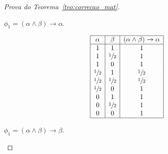 \begin{proof}[Prova do Teorema~\ref{teo:correcao_mat}]
\begin{provaporcasos}
\begin{provaporsubcasos}
                    

                    \subcasodeprova{} $\phi_{1} = (\alpha \land \beta) \to \alpha$. 


                    \begin{center}
                        \[
                            \begin{array}{|c|c|c|}%
                                \hline%
                                \alpha      & \beta & (\alpha \land \beta) \to \alpha \\
                                \hline%
                                1 & 1 &                 1\\
                                1 & \meio{} &1\\
                                1 & 0 &1\\
                                \meio{} & 1 &\meio{}\\
                                \meio{} & \meio{} &\meio{}\\
                                \meio{} & 0 &1\\
                                0 & 1 &1\\
                                0 & \meio{} &1\\
                                0 & 0 &1\\
                                \hline%
                            \end{array}
                        \]
                    \end{center}
                    

                    \subcasodeprova{} $\phi_{1} = (\alpha \land \beta) \to \beta$.


\end{provaporsubcasos}
\end{provaporcasos}
\end{proof}
